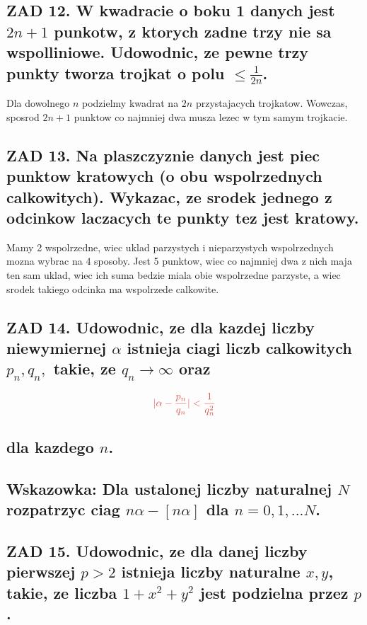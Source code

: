 \documentclass{article}
\begin{document}
\subsection*{\color{tit}ZAD 12. W kwadracie o boku 1 danych jest $2n+1$ punkotw, z ktorych zadne trzy nie sa wspolliniowe. Udowodnic, ze pewne trzy punkty tworza trojkat o polu $\leq\frac1{2n}$.}
  Dla dowolnego $n$ podzielmy kwadrat na $2n$ przystajacych trojkatow. Wowczas, sposrod $2n+1$ punktow co najmniej dwa musza lezec w tym samym trojkacie. 
\subsection*{\color{tit}ZAD 13. Na plaszczyznie danych jest piec punktow kratowych (o obu wspolrzednych calkowitych). Wykazac, ze srodek jednego z odcinkow laczacych te punkty tez jest kratowy.}
  Mamy 2 wspolrzedne, wiec uklad parzystych i nieparzystych wspolrzednych mozna wybrac na 4 sposoby. Jest 5 punktow, wiec co najmniej dwa z nich maja ten sam uklad, wiec ich suma bedzie miala obie wspolrzedne parzyste, a wiec srodek takiego odcinka ma wspolrzede calkowite.
\subsection*{\color{tit}ZAD 14. Udowodnic, ze dla kazdej liczby niewymiernej $\alpha$ istnieja ciagi liczb calkowitych $p_n, q_n,$ takie, ze $q_n\to\infty$ oraz}
$$\color{tit}|\alpha-\frac{p_n}{q_n}|<\frac1{q_n^2}$$
\subsection*{dla kazdego $n$.}
\subsection*{Wskazowka: Dla ustalonej liczby naturalnej $N$ rozpatrzyc ciag $n\alpha-[n\alpha]$ dla $n=0, 1, ...N$.}
\subsection*{ZAD 15. Udowodnic, ze dla danej liczby pierwszej $p>2$ istnieja liczby naturalne $x, y$, takie, ze liczba $1+x^2+y^2$ jest podzielna przez $p$.}
\end{document}
